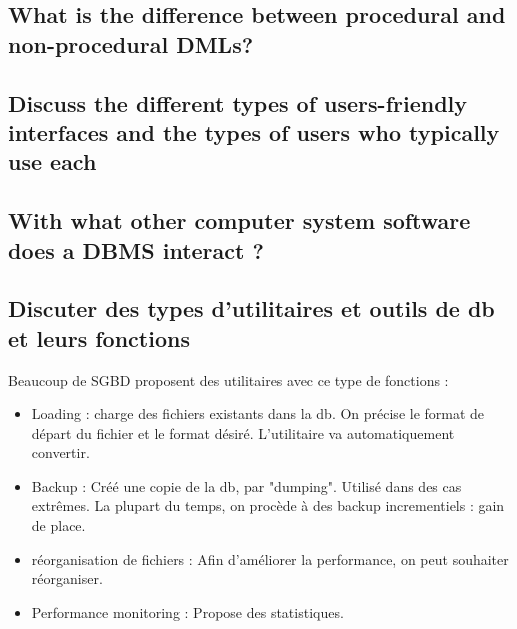 \subsection{What is the difference between procedural and non-procedural DMLs?}

\subsection{Discuss the different types of users-friendly interfaces and the types of users who typically use each}

\subsection{With what other computer system software does a DBMS interact ?}

\subsection{Discuter des types d'utilitaires et outils de db et leurs fonctions}
Beaucoup de SGBD proposent des utilitaires avec ce type de fonctions :
\begin{itemize}
	\item Loading : charge des fichiers existants dans la db. On précise le 
	format de départ du fichier et le format désiré. L'utilitaire 
	va automatiquement convertir. 
	\item Backup : Créé une copie de la db, par "dumping". Utilisé dans des 
	cas extrêmes. La plupart du temps, on procède à des backup incrementiels : gain de place.
	\item réorganisation de fichiers : Afin d'améliorer la performance, on peut souhaiter réorganiser.
	\item Performance monitoring : Propose des statistiques.
\end{itemize}